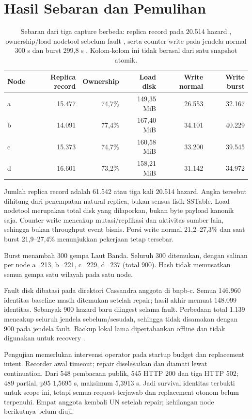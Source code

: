 \section{Hasil Sebaran dan Pemulihan}
\begin{table}[htbp]\centering\small
\begin{tabular}{@{}lrrrrr@{}}
\toprule Node & Replica record & Ownership & Load disk & Write normal & Write burst\\\midrule
a & 15.477 & 74,7\% & 149,35 MiB & 26.553 & 32.167\\
b & 14.091 & 77,4\% & 167,40 MiB & 34.101 & 40.229\\
c & 15.373 & 74,7\% & 160,58 MiB & 33.200 & 39.545\\
d & 16.601 & 73,2\% & 158,21 MiB & 31.142 & 34.972\\\bottomrule
\end{tabular}
\caption{Sebaran dari tiga capture berbeda: replica record pada 20.514 hazard , ownership/load nodetool sebelum fault , serta counter write pada jendela normal 300 s dan burst 299,8 s . Kolom-kolom ini tidak berasal dari satu snapshot atomik.}
\end{table}
Jumlah replica record adalah 61.542 atau tiga kali 20.514 hazard. Angka tersebut dihitung dari penempatan natural replica, bukan sensus fisik SSTable. Load nodetool merupakan total disk yang dilaporkan, bukan byte payload kanonik saja. Counter write mencakup mutasi/replikasi dan aktivitas sumber lain, sehingga bukan throughput event bisnis. Porsi write normal 21,2--27,3\% dan saat burst 21,9--27,4\% menunjukkan pekerjaan tetap tersebar.

Burst menambah 300 gempa Laut Banda. Seluruh 300 ditemukan, dengan salinan per node a=213, b=221, c=229, d=237 (total 900). Hash tidak memusatkan semua gempa satu wilayah pada satu node.

Fault disk dibatasi pada direktori Cassandra anggota di bnpb-c. Semua 146.960 identitas baseline masih ditemukan setelah repair; hasil akhir memuat 148.099 identitas. Sebanyak 900 hazard baru diingest selama fault. Perbedaan total 1.139 mencakup seluruh jendela sebelum/sesudah, sehingga tidak disamakan dengan 900 pada jendela fault. Backup lokal lama dipertahankan offline dan tidak digunakan untuk recovery .

Pengujian memerlukan intervensi operator pada startup budget dan replacement intent. Recorder awal timeout; repair diselesaikan dan diamati lewat continuation. Dari 548 pembacaan publik, 545 HTTP 200 dan tiga HTTP 502; 489 partial, p95 1,5695 s, maksimum 5,3913 s. Jadi survival identitas terbukti untuk scope ini, tetapi semua-request-terjawab dan replacement otonom belum terpenuhi. Empat anggota kembali UN setelah repair; kehilangan node berikutnya belum diuji.

